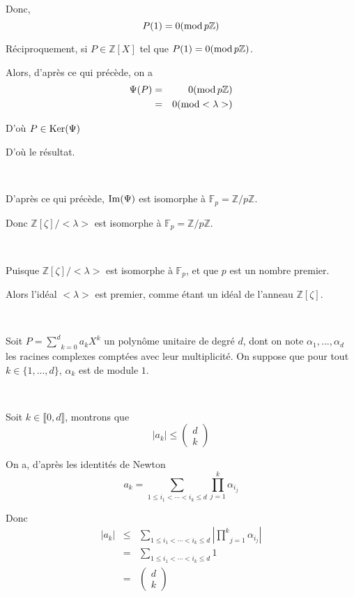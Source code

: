 Donc,
\[ P (1) = 0 (\operatorname{mod} p\mathbb{Z}) \]


R{\'e}ciproquement, si $P \in \mathbb{Z} [X]$ tel que $P (1) = 0 (\operatorname{mod}
p\mathbb{Z})$.

Alors, d'apr{\`e}s ce qui pr{\'e}c{\`e}de, on a
\begin{eqnarray*}
  \Psi (P) & = & 0 (\operatorname{mod} p\mathbb{Z})\\
  & = & 0 (\operatorname{mod} < \lambda >)
\end{eqnarray*}


D'o{\`u} $P \in \operatorname{Ker} (\Psi)$

D'o{\`u} le r{\'e}sultat.

\

 D'apr{\`e}s ce qui pr{\'e}c{\`e}de, $\operatorname{Im} (\Psi)$ est
isomorphe {\`a} $\mathbb{F}_p =\mathbb{Z}/ p\mathbb{Z}$.

Donc $\mathbb{Z} [\zeta] / < \lambda >$ est isomorphe {\`a} $\mathbb{F}_p
=\mathbb{Z}/ p\mathbb{Z}$.

\

 Puisque $\mathbb{Z} [\zeta] / < \lambda >$ est isomorphe
{\`a} $\mathbb{F}_p$, et que $p$ est un nombre premier.

Alors l'id{\'e}al $< \lambda >$ est premier, comme {\'e}tant un id{\'e}al de
l'anneau $\mathbb{Z} [\zeta]$.

\

 Soit $P = \underset{k = 0}{\overset{d}{\sum}} a_k X^k$ un
polyn{\^o}me unitaire de degr{\'e} $d$, dont on note $\alpha_1, . . .,
\alpha_d$ les racines complexes compt{\'e}es avec leur multiplicit{\'e}. On
suppose que pour tout $k \in \{1, . . ., d\}$, $\alpha_k$ est de module $1$.

\

 Soit $k \in \llbracket 0, d \rrbracket$, montrons que
\[ | a_k | \leqslant \left( \begin{array}{c}
     d\\
     k
   \end{array} \right) \]


On a, d'apr{\`e}s les identit{\'e}s de Newton
\[ a_k = \underset{1 \leqslant i_1 < \cdots < i_k \leqslant d}{\sum} 
   \underset{j = 1}{\overset{k}{\prod}} \alpha_{i_j} \]


Donc
\begin{eqnarray*}
  | a_k | & \leqslant & \underset{1 \leqslant i_1 < \cdots < i_k \leqslant
  d}{\sum}  \left| \underset{j = 1}{\overset{k}{\prod}} \alpha_{i_j} \right|\\
  & = & \underset{1 \leqslant i_1 < \cdots < i_k \leqslant d}{\sum} 1\\
  & = & \left( \begin{array}{c}
    d\\
    k
  \end{array} \right)
\end{eqnarray*}


